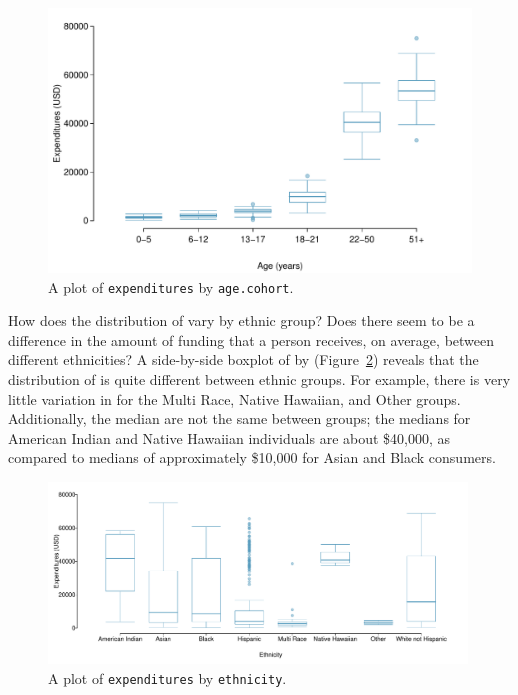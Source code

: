 \begin{figure}[h]
	\centering
	\includegraphics[width=\textwidth]{ch_intro_to_data_oi_biostat/figures/ddsExpAge/ddsExpAge}
	\caption{A plot of \texttt{expenditures} by \texttt{age.cohort}. }
	\label{ddsExpAge}
\end{figure}

\textD{\newpage}

How does the distribution of  vary by ethnic group? Does there seem to be a difference in the amount of funding that a person receives, on average, between different ethnicities? A side-by-side boxplot of  by  (Figure~\ref{ddsExpEthnicity}) reveals that the distribution of  is quite different between ethnic groups. For example, there is very little variation in  for the Multi Race, Native Hawaiian, and Other groups. Additionally, the median  are not the same between groups; the medians for American Indian and Native Hawaiian individuals are about \$40,000, as compared to medians of approximately \$10,000 for Asian and Black consumers.   

\begin{figure}[h]
	\centering
	\includegraphics[width=0.99\textwidth]{ch_intro_to_data_oi_biostat/figures/ddsExpEthnicity/ddsExpEthnicity}
	\caption{A plot of \texttt{expenditures} by \texttt{ethnicity}. }
	\label{ddsExpEthnicity}
\end{figure} 

